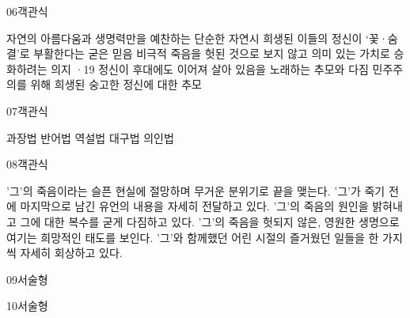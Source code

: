 \documentclass[fs85,seriesRus]{korfarm-base}
\begin{document}
\begin{kfQBlock}{06}{객관식}
\begin{kfChoices}
\kfChoice 자연의 아름다움과 생명력만을 예찬하는 단순한 자연시
\kfChoice 희생된 이들의 정신이 ‘꽃·숨결’로 부활한다는 굳은 믿음
\kfChoice 비극적 죽음을 헛된 것으로 보지 않고 의미 있는 가치로 승화하려는 의지
·19 정신이 후대에도 이어져 살아 있음을 노래하는 추모와 다짐
\kfChoice 민주주의를 위해 희생된 숭고한 정신에 대한 추모
\end{kfChoices}
\end{kfQBlock}
\begin{kfQBlock}{07}{객관식}
\begin{kfChoices}
\kfChoice 과장법
\kfChoice 반어법
\kfChoice 역설법
\kfChoice 대구법
\kfChoice 의인법
\end{kfChoices}
\end{kfQBlock}
\begin{kfQBlock}{08}{객관식}
\begin{kfChoices}
\kfChoice '그'의 죽음이라는 슬픈 현실에 절망하며 무거운 분위기로 끝을 맺는다.
\kfChoice '그'가 죽기 전에 마지막으로 남긴 유언의 내용을 자세히 전달하고 있다.
\kfChoice '그'의 죽음의 원인을 밝혀내고 그에 대한 복수를 굳게 다짐하고 있다.
\kfChoice '그'의 죽음을 헛되지 않은, 영원한 생명으로 여기는 희망적인 태도를 보인다.
\kfChoice '그'와 함께했던 어린 시절의 즐거웠던 일들을 한 가지씩 자세히 회상하고 있다.
\end{kfChoices}
\end{kfQBlock}
\begin{kfQBlock}{09}{서술형}
\end{kfQBlock}
\begin{kfQBlock}{10}{서술형}
\end{kfQBlock}
\kfEndMC


\end{document}
